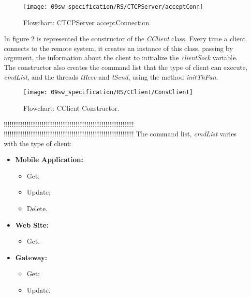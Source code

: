 \begin{figure}[H]
	\centering
	\texttt{[image: 09sw\_specification/RS/CTCPServer/acceptConn]}
	\caption{Flowchart: CTCPServer acceptConnection.}
	\label{fig:acceptConn}
\end{figure}


In figure \ref{fig:ClientConst} is represented the constructor of the \textit{CClient} class. Every time a client connects to the remote system, it creates an instance of this class, passing by argument, the information about the client to initialize the \textit{clientSock} variable. The constructor also creates the command list that the type of client can execute, \textit{cmdList}, and the threads \textit{tRecv} and \textit{tSend}, using the method \textit{initThFun}.

\begin{figure}[H]
	\centering
	\texttt{[image: 09sw\_specification/RS/CClient/ConsClient]}
	\caption{Flowchart: CClient Constructor.}
	\label{fig:ClientConst}
\end{figure}

!!!!!!!!!!!!!!!!!!!!!!!!!!!!!!!!!!!!!!!!!!!!!!!!!!!!!!!!!!!!!!!!!!!!!
!!!!!!!!!!!!!!!!!!!!!!!!!!!!!!!!!!!!!!!!!!!!!!!!!!!!!!!!!!!!!!!!!!!!!
The command list, \textit{cmdList} varies with the type of client:

\begin{itemize}
	\item \textbf{Mobile Application:} 
		\begin{itemize}
			\item Get;
			\item Update;
			\item Delete.
		\end{itemize}
	
	\item \textbf{Web Site:}
		\begin{itemize}
			\item Get.			
		\end{itemize}
	
	\item \textbf{Gateway:}
		\begin{itemize}
			\item Get;
			\item Update.
		\end{itemize}

\end{itemize}

